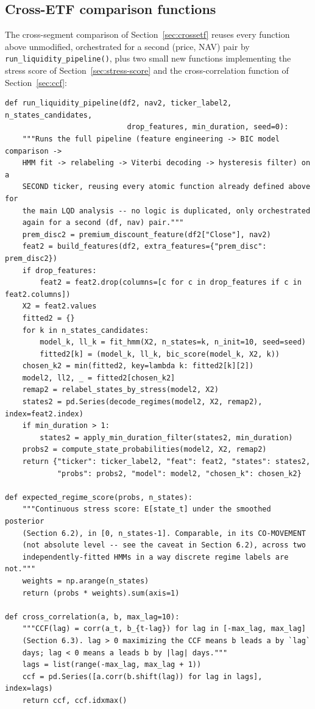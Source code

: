 \documentclass[11pt]{article}
\theoremstyle{definition}
\theoremstyle{remark}
\begin{document}
\subsection{Cross-ETF comparison functions}
\label{sec:appendix-crossetf}

The cross-segment comparison of Section~\ref{sec:crossetf} reuses every function above unmodified, orchestrated for a second (price, NAV) pair by \texttt{run\_liquidity\_pipeline()}, plus two small new functions implementing the stress score of Section~\ref{sec:stress-score} and the cross-correlation function of Section~\ref{sec:ccf}:

\begin{lstlisting}
def run_liquidity_pipeline(df2, nav2, ticker_label2, n_states_candidates,
                            drop_features, min_duration, seed=0):
    """Runs the full pipeline (feature engineering -> BIC model comparison ->
    HMM fit -> relabeling -> Viterbi decoding -> hysteresis filter) on a
    SECOND ticker, reusing every atomic function already defined above for
    the main LQD analysis -- no logic is duplicated, only orchestrated
    again for a second (df, nav) pair."""
    prem_disc2 = premium_discount_feature(df2["Close"], nav2)
    feat2 = build_features(df2, extra_features={"prem_disc": prem_disc2})
    if drop_features:
        feat2 = feat2.drop(columns=[c for c in drop_features if c in feat2.columns])
    X2 = feat2.values
    fitted2 = {}
    for k in n_states_candidates:
        model_k, ll_k = fit_hmm(X2, n_states=k, n_init=10, seed=seed)
        fitted2[k] = (model_k, ll_k, bic_score(model_k, X2, k))
    chosen_k2 = min(fitted2, key=lambda k: fitted2[k][2])
    model2, ll2, _ = fitted2[chosen_k2]
    remap2 = relabel_states_by_stress(model2, X2)
    states2 = pd.Series(decode_regimes(model2, X2, remap2), index=feat2.index)
    if min_duration > 1:
        states2 = apply_min_duration_filter(states2, min_duration)
    probs2 = compute_state_probabilities(model2, X2, remap2)
    return {"ticker": ticker_label2, "feat": feat2, "states": states2,
            "probs": probs2, "model": model2, "chosen_k": chosen_k2}

def expected_regime_score(probs, n_states):
    """Continuous stress score: E[state_t] under the smoothed posterior
    (Section 6.2), in [0, n_states-1]. Comparable, in its CO-MOVEMENT
    (not absolute level -- see the caveat in Section 6.2), across two
    independently-fitted HMMs in a way discrete regime labels are not."""
    weights = np.arange(n_states)
    return (probs * weights).sum(axis=1)

def cross_correlation(a, b, max_lag=10):
    """CCF(lag) = corr(a_t, b_{t-lag}) for lag in [-max_lag, max_lag]
    (Section 6.3). lag > 0 maximizing the CCF means b leads a by `lag`
    days; lag < 0 means a leads b by |lag| days."""
    lags = list(range(-max_lag, max_lag + 1))
    ccf = pd.Series([a.corr(b.shift(lag)) for lag in lags], index=lags)
    return ccf, ccf.idxmax()
\end{lstlisting}
\end{document}
